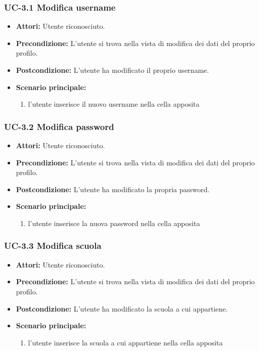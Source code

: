 \subsubsection{UC-3.1 Modifica username}
\begin{itemize}
			\item \textbf{Attori:} Utente riconosciuto.
			\item \textbf{Precondizione:} L'utente si trova nella vista di modifica dei dati del proprio profilo.
			\item \textbf{Postcondizione:} L'utente ha modificato il proprio username.
			\item \textbf{Scenario principale:}
			\begin{enumerate}
				\item l'utente inserisce il nuovo username nella cella apposita
			\end{enumerate}
\end{itemize}

\subsubsection{UC-3.2 Modifica password}
\begin{itemize}
			\item \textbf{Attori:} Utente riconosciuto.
			\item \textbf{Precondizione:} L'utente si trova nella vista di modifica dei dati del proprio profilo.
			\item \textbf{Postcondizione:} L'utente ha modificato la propria password.
			\item \textbf{Scenario principale:}
			\begin{enumerate}
				\item l'utente inserisce la nuova password nella cella apposita
			\end{enumerate}
\end{itemize}

\subsubsection{UC-3.3 Modifica scuola}
\begin{itemize}
			\item \textbf{Attori:} Utente riconosciuto.
			\item \textbf{Precondizione:} L'utente si trova nella vista di modifica dei dati del proprio profilo.
			\item \textbf{Postcondizione:} L'utente ha modificato la scuola a cui appartiene.
			\item \textbf{Scenario principale:}
			\begin{enumerate}
				\item l'utente inserisce la scuola a cui appartiene nella cella apposita
			\end{enumerate}
\end{itemize}


